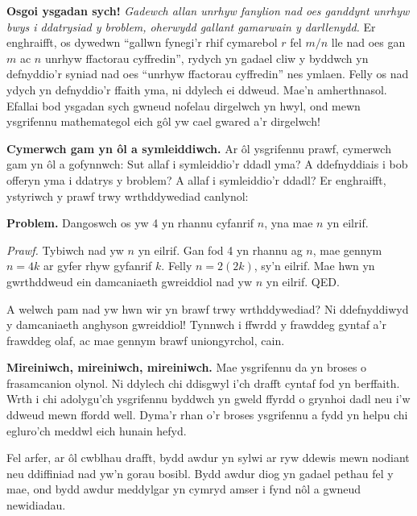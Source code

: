 \documentclass{article}
\begin{document}
\begin{multicols}{2}
\vspace{4mm}

\textbf{Osgoi ysgadan sych!}
\textit{Gadewch allan unrhyw fanylion nad oes ganddynt unrhyw bwys i ddatrysiad
y broblem, oherwydd gallant gamarwain y darllenydd.}
Er enghraifft, os dywedwn ``gallwn fynegi'r rhif cymarebol $r$ fel $m/n$ lle nad
oes gan $m$ ac $n$ unrhyw ffactorau cyffredin'', rydych yn gadael cliw y byddwch
yn defnyddio'r syniad nad oes ``unrhyw ffactorau cyffredin'' nes ymlaen.
Felly os nad ydych yn defnyddio'r ffaith yma, ni ddylech ei ddweud.
Mae'n amherthnasol.
Efallai bod ysgadan sych gwneud nofelau dirgelwch yn hwyl, ond mewn ysgrifennu
mathemategol eich g\^{o}l yw cael gwared a'r dirgelwch!


\vspace{4mm}

\textbf{Cymerwch gam yn \^{o}l a symleiddiwch.}
Ar \^{o}l ysgrifennu prawf, cymerwch gam yn \^{o}l a gofynnwch:
Sut allaf i symleiddio'r ddadl yma?
A ddefnyddiais i bob offeryn yma i ddatrys y broblem?
A allaf i symleiddio'r ddadl?
Er enghraifft, ystyriwch y prawf trwy wrthddywediad canlynol:

\setlength{\leftskip}{0.7cm}

\textbf{Problem.}
Dangoswch os yw 4 yn rhannu cyfanrif $n$, yna mae $n$ yn eilrif.

\textit{Prawf.}
Tybiwch nad yw $n$ yn eilrif.
Gan fod 4 yn rhannu ag $n$, mae gennym $n = 4k$ ar gyfer rhyw gyfanrif $k$.
Felly $n = 2(2k)$, sy'n eilrif.
Mae hwn yn gwrthddweud ein damcaniaeth gwreiddiol nad yw $n$ yn eilrif. QED.

\setlength{\leftskip}{0pt}

A welwch pam nad yw hwn wir yn brawf trwy wrthddywediad?
Ni ddefnyddiwyd y damcaniaeth anghyson gwreiddiol!
Tynnwch i ffwrdd y frawddeg gyntaf a'r frawddeg olaf, ac mae gennym brawf
uniongyrchol, cain.

\vspace{4mm}

\textbf{Mireiniwch, mireiniwch, mireiniwch.}
Mae ysgrifennu da yn broses o frasamcanion olynol.
Ni ddylech chi ddisgwyl i'ch drafft cyntaf fod yn berffaith.
Wrth i chi adolygu'ch ysgrifennu byddwch yn gweld ffyrdd o grynhoi dadl neu i'w
ddweud mewn ffordd well.
Dyma'r rhan o'r broses ysgrifennu a fydd yn helpu chi egluro'ch meddwl eich
hunain hefyd.

Fel arfer, ar \^{o}l cwblhau drafft, bydd awdur yn sylwi ar ryw ddewis mewn
nodiant neu ddiffiniad nad yw'n gorau bosibl.
Bydd awdur diog yn gadael pethau fel y mae, ond bydd awdur meddylgar yn cymryd
amser i fynd n\^{o}l a gwneud newidiadau.


\end{multicols}
\end{document}
